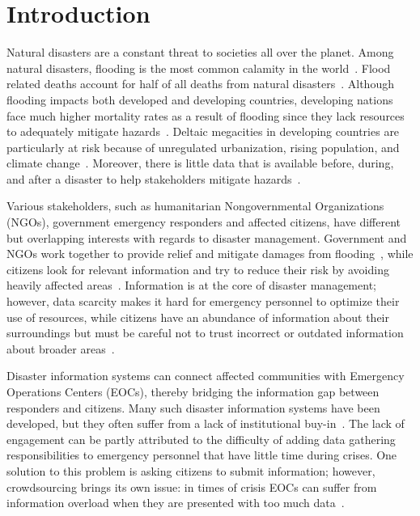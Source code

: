 \chapter{Introduction} Natural disasters are a constant threat to societies all
over the planet. Among natural disasters, flooding is the most common calamity
in the world~\cite{chanFloodRiskAsia2012}.  Flood related deaths account for
half of all deaths from natural disasters~\cite{ohlFloodingHumanHealth2000}.
Although flooding impacts both developed and developing countries, developing
nations face much higher mortality rates as a result of flooding since they lack
resources to adequately mitigate
hazards~\cite{quarantelliUrbanVulnerabilityDisasters2003,
ahernGlobalHealthImpacts2005}. Deltaic megacities in developing countries are
particularly at risk because of unregulated urbanization, rising population, and
climate change~\cite{chanFloodRiskAsia2012}.  Moreover, there is little data
that is available before, during, and after a disaster to help stakeholders
mitigate hazards~\cite{meierDigitalHumanitariansHow2015}.

Various stakeholders, such as humanitarian Nongovernmental Organizations (NGOs),
government emergency responders and affected citizens, have different but
overlapping interests with regards to disaster management.  Government and NGOs
work together to provide relief and mitigate damages from
flooding~\cite{chanResilientFloodRisk2018}, while citizens
look for relevant information and try to reduce their
risk by avoiding heavily affected
areas~\cite{viewegMicrobloggingTwoNatural2010}. Information is at the core of
disaster management; however, data scarcity makes it hard for emergency
personnel to optimize their use of resources, while citizens have an abundance
of information about their surroundings but must be careful not to trust
incorrect or outdated information about broader
areas~\cite{quarantelliProblematicalAspectsInformation1997}.

Disaster information systems can connect affected communities with
Emergency Operations Centers (EOCs), thereby bridging the information gap
between responders and citizens. Many such disaster information systems have
been developed, but they often suffer from a lack of institutional
buy-in~\cite{aminDataNaturalDisasters2008}. The lack of engagement can be partly
attributed to the difficulty of adding data gathering responsibilities to
emergency personnel that have little time during crises. One solution to this
problem is asking citizens to submit information; however, crowdsourcing brings
its own issue: in times of crisis EOCs can suffer from information overload when
they are presented with too much
data~\cite{tierneyFacingUnexpectedDisaster2001}.

